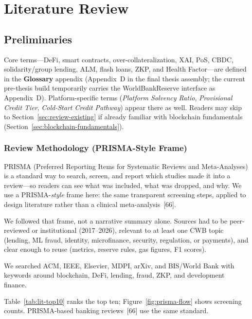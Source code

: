 \documentclass[12pt, a4paper]{report}
\begin{document}
\chapter{Literature Review}

\section{Preliminaries}
\label{sec:preliminaries}

Core terms---DeFi, smart contracts, over-collateralization, XAI, PoS, CBDC, solidarity/group lending, ALM, flash loans, ZKP, and Health Factor---are defined in the \textbf{Glossary} appendix (Appendix~D in the final thesis assembly; the current pre-thesis build temporarily carries the WorldBankReserve interface as Appendix~D). Platform-specific terms (\textit{Platform Solvency Ratio}, \textit{Provisional Credit Tier}, \textit{Cold-Start Credit Pathway}) appear there as well. Readers may skip to Section~\ref{sec:review-existing} if already familiar with blockchain fundamentals (Section~\ref{sec:blockchain-fundamentals}).

\subsection{Review Methodology (PRISMA-Style Frame)}
\label{sec:lit-prisma}

PRISMA (Preferred Reporting Items for Systematic Reviews and Meta-Analyses) is a standard way to search, screen, and report which studies made it into a review---so readers can see what was included, what was dropped, and why. We use a PRISMA-\emph{style} frame here: the same transparent screening steps, applied to design literature rather than a clinical meta-analysis~[66].

We followed that frame, not a narrative summary alone. Sources had to be peer-reviewed or institutional (2017--2026), relevant to at least one CWB topic (lending, ML fraud, identity, microfinance, security, regulation, or payments), and clear enough to reuse (metrics, reserve rules, gas figures, F1 scores).

We searched ACM, IEEE, Elsevier, MDPI, arXiv, and BIS/World Bank with keywords around blockchain, DeFi, lending, fraud, ZKP, and development finance.

Table~\ref{tab:lit-top10} ranks the top ten; Figure~\ref{fig:prisma-flow} shows screening counts. PRISMA-based banking reviews~[66] use the same standard.
\end{document}
